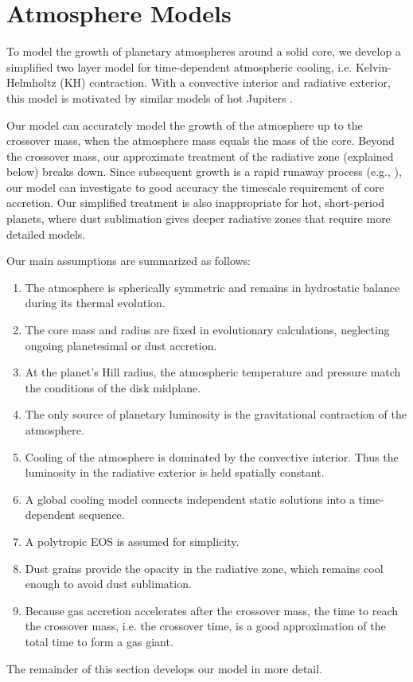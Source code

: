 \documentclass[apj, numberedappendix]{emulateapj}
\begin{document}


\section{Atmosphere Models} \label{sec:model}

To model the growth of planetary atmospheres around a solid core, we develop a simplified two layer model for time-dependent atmospheric cooling, i.e. Kelvin-Helmholtz (KH) contraction.  With a convective interior and radiative exterior, this model is motivated by similar models of hot Jupiters \citep{ab06, ym10}. 

Our model can accurately model the growth of the atmosphere up to the crossover mass, when the atmosphere mass equals the mass of the core.   Beyond the crossover mass,  our approximate treatment of the radiative zone (explained below) breaks down.  
Since subsequent growth is a rapid runaway process (e.g., \citealt{pollack96}), our model can investigate to good accuracy the timescale requirement of core accretion.  Our simplified treatment is also inappropriate for hot, short-period planets, where dust sublimation gives deeper radiative zones that require more detailed models.

Our main assumptions are summarized as follows:
\begin{enumerate}
\item The atmosphere is spherically symmetric and remains in hydrostatic balance during its thermal evolution.
\item The core mass and radius are fixed in evolutionary calculations, neglecting ongoing planetesimal or dust accretion.
\item At the planet's Hill radius, the atmospheric temperature and pressure match the conditions of the disk midplane.
\item The only source of planetary luminosity is the gravitational contraction of the atmosphere.  
\item Cooling of the atmosphere is dominated by the convective interior.  Thus the luminosity in the radiative exterior is held spatially constant. %
\item A global cooling model connects independent static solutions into a time-dependent sequence.
\item A polytropic EOS is assumed for simplicity. %
\item Dust grains provide the opacity in the radiative zone, which remains cool enough to avoid dust sublimation.
\item Because gas accretion accelerates after the crossover mass, the time to reach the crossover mass, i.e. the crossover time, is a good approximation of the total time to form a gas giant.
\end{enumerate}
The remainder of this section develops our model in more detail.
\end{document}
